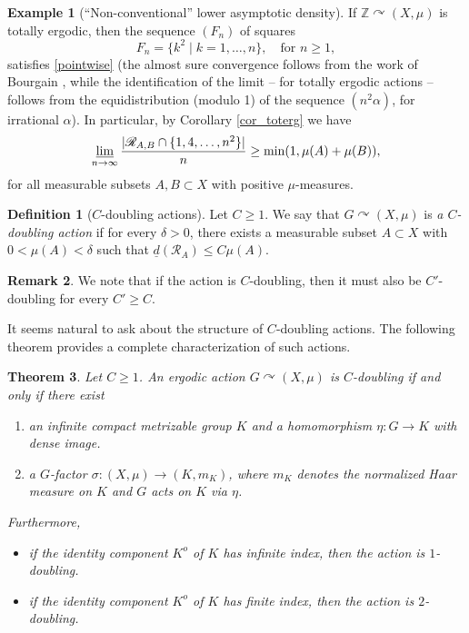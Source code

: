 \documentclass[10pt]{amsart}
\let\mathcal\mathscr
\newcommand{\cR}{\mathcal{R}}
\newcommand{\bZ}{\mathbb{Z}}
\let\acts\curvearrowright
\theoremstyle{plain}
\newtheorem{theorem}{Theorem}[section]
\theoremstyle{definition}
\newtheorem{definition}[theorem]{Definition}
\newtheorem{remark}[theorem]{Remark}
\newtheorem{example}{Example}[section]
\begin{document}
\begin{example}[``Non-conventional'' lower asymptotic density]
If $\bZ \acts (X,\mu)$ is totally ergodic, then the sequence $(F_n)$ of squares
\[
F_n = \{ k^2 \mid k = 1,\ldots,n\}, \quad \textrm{for $n \geq 1$},
\]
satisfies \eqref{pointwise} (the almost sure convergence follows from the work of Bourgain \cite{Bo88}, while the identification of the limit -- for totally ergodic actions -- follows from the equidistribution (modulo 1) of the sequence $(n^2 \alpha)$, for irrational $\alpha$). In particular, by Corollary \ref{cor_toterg} we have
\[
\varliminf_{n \to \infty} \frac{|\cR_{A,B} \cap \{1,4,\ldots,n^2\}|}{n} \geq \min(1,\mu(A) + \mu(B)),
\]
for all measurable subsets $A, B \subset X$ with positive $\mu$-measures.
\end{example}


\begin{definition}[$C$\nobreakdash-doubling actions]
Let $C \geq 1$. We say that $G \acts (X,\mu)$ is \emph{a $C$\nobreakdash-doubling action} if for every $\delta > 0$, there
exists a measurable subset $A \subset X$ with $0 < \mu(A) < \delta$ such that $\underline{d}(\cR_A) \leq C\mu(A)$.
\end{definition}

\begin{remark}
We note that if the action is $C$\nobreakdash-doubling, then it must also be $C'$\nobreakdash-doubling for every $C' \geq C$.
\end{remark}

It seems natural to ask about the structure of $C$\nobreakdash-doubling actions. The following theorem provides a complete
characterization of such actions.

\begin{theorem}
\label{thm4}
Let $C \geq 1$. An ergodic action $G \acts (X,\mu)$ is $C$\nobreakdash-doubling if and only if there exist

\begin{enumerate}
\item
an infinite compact metrizable group $K$ and a homomorphism $\eta : G \to K$ with dense image.
\item
a $G$-factor $\sigma : (X,\mu) \to (K,m_K)$, where $m_K$ denotes the normalized Haar measure on $K$
and $G$ acts on $K$ via $\eta$.
\end{enumerate}
Furthermore,

\begin{itemize}
\item if the identity component $K^o$ of $K$ has infinite index, then the action is $1$\nobreakdash-doubling.

\item if the identity component $K^o$ of $K$ has finite index, then the action is $2$\nobreakdash-doubling.
\end{itemize}
\end{theorem}
\end{document}
